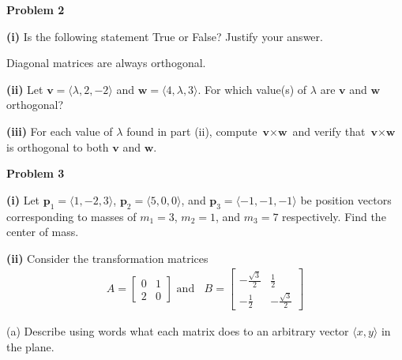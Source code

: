 \documentclass[12pt]{amsbook}
\begin{document}
\newpage

\textbf{Problem 2}

\vspace{.25cm}

\textbf{(i)} Is the following statement True or False? Justify your answer.
\begin{center}
Diagonal matrices are always orthogonal.
\end{center}

\vspace{4cm}


\textbf{(ii)} Let $\textbf{v} = \langle \lambda,2,-2 \rangle$ and $\textbf{w} = \langle 4,\lambda,3 \rangle$. For which value(s) of $\lambda$ are $\textbf{v}$ and $\textbf{w}$ orthogonal?



\vspace{4cm}

\textbf{(iii)} For each value of $\lambda$ found in part (ii), compute $\textbf{v}\times\textbf{w}$ and verify that $\textbf{v}\times\textbf{w}$ is orthogonal to both $\textbf{v}$ and $\textbf{w}$.







\newpage

\textbf{Problem 3}

\vspace{.25cm}

\textbf{(i)} Let $\textbf{p}_1 = \langle 1,-2,3\rangle $, $\textbf{p}_2 = \langle 5,0,0\rangle $, and $\textbf{p}_3=\langle -1,-1,-1\rangle $ be position vectors corresponding to masses of $m_1=3$, $m_2=1$, and $m_3=7$ respectively. Find the center of mass.


\vspace{4cm}

\textbf{(ii)} Consider the transformation matrices 
\begin{align*}A=\left[\begin{array}{cc} 0 & 1 \\ 2 & 0\end{array}\right] \text{ and }\;\; B=\left[\begin{array}{cc} -\frac{\sqrt{3}}{2} & \frac{1}{2}\\ -\frac{1}{2} & -\frac{\sqrt{3}}{2}\end{array}\right]
\end{align*}

(a) Describe using words what each matrix does to an arbitrary vector $\langle x,y\rangle $ in the plane.
\end{document}

